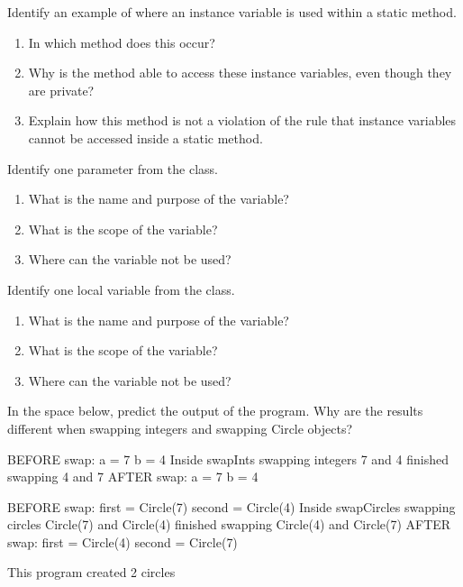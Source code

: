 \Q Identify an example of where an instance variable is used within a static method.
\begin{enumerate}
\item In which method does this occur?
\item Why is the method able to access these instance variables, even though they are private?
\item Explain how this method is not a violation of the rule that instance variables cannot be accessed inside a static method.
\end{enumerate}


\Q Identify one parameter from the  class.
\begin{enumerate}
\item What is the name and purpose of the variable?
\item What is the scope of the variable?
\item Where can the variable not be used?
\end{enumerate}


\Q Identify one local variable from the  class.
\begin{enumerate}
\item What is the name and purpose of the variable?
\item What is the scope of the variable?
\item Where can the variable not be used?
\end{enumerate}

\Q In the space below, predict the output of the  program.
Why are the results different when swapping integers and swapping Circle objects?

\begin{answer}[20em]
\begin{javaans}
BEFORE swap:
a = 7  b = 4
    Inside swapInts
    swapping integers 7 and 4
    finished swapping 4 and 7
AFTER swap:
a = 7  b = 4

BEFORE swap:
first = Circle(7)  second = Circle(4)
    Inside swapCircles
    swapping circles Circle(7) and Circle(4)
    finished swapping Circle(4) and Circle(7)
AFTER swap:
first = Circle(4)  second = Circle(7)

This program created 2 circles
\end{javaans}
\end{answer}

\newpage

